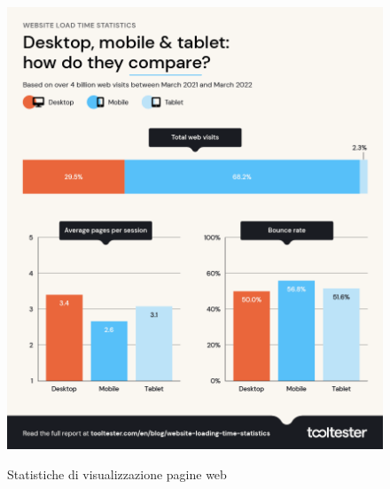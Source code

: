 \begin{figure}[H]
   \centering
   \includegraphics[scale=0.25]{resources/website-load-time-statistics-desktop-mobile-tablet.png}
\cite{website-loading-time-statistics}
\caption{Statistiche di visualizzazione pagine web}
\end{figure}


